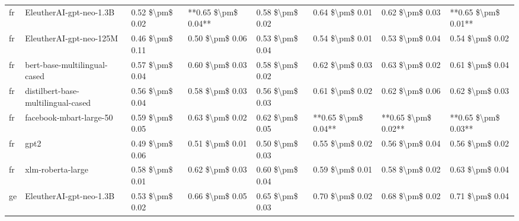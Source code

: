 \begin{tabular}{llllllll}
      fr &            EleutherAI-gpt-neo-1.3B & 0.52 \$\textbackslash pm\$ 0.02 &       **0.65 \$\textbackslash pm\$ 0.04** &       0.58 \$\textbackslash pm\$ 0.02 &        0.64 \$\textbackslash pm\$ 0.01 &                         0.62 \$\textbackslash pm\$ 0.03 & **0.65 \$\textbackslash pm\$ 0.01** \\
      fr &            EleutherAI-gpt-neo-125M & 0.46 \$\textbackslash pm\$ 0.11 &           0.50 \$\textbackslash pm\$ 0.06 &       0.53 \$\textbackslash pm\$ 0.04 &        0.54 \$\textbackslash pm\$ 0.01 &                         0.53 \$\textbackslash pm\$ 0.04 &     0.54 \$\textbackslash pm\$ 0.02 \\
      fr &       bert-base-multilingual-cased & 0.57 \$\textbackslash pm\$ 0.04 &           0.60 \$\textbackslash pm\$ 0.03 &       0.58 \$\textbackslash pm\$ 0.02 &        0.62 \$\textbackslash pm\$ 0.03 &                         0.63 \$\textbackslash pm\$ 0.02 &     0.61 \$\textbackslash pm\$ 0.04 \\
      fr & distilbert-base-multilingual-cased & 0.56 \$\textbackslash pm\$ 0.04 &           0.58 \$\textbackslash pm\$ 0.03 &       0.56 \$\textbackslash pm\$ 0.03 &        0.61 \$\textbackslash pm\$ 0.02 &                         0.62 \$\textbackslash pm\$ 0.06 &     0.62 \$\textbackslash pm\$ 0.03 \\
      fr &            facebook-mbart-large-50 & 0.59 \$\textbackslash pm\$ 0.05 &           0.63 \$\textbackslash pm\$ 0.02 &       0.62 \$\textbackslash pm\$ 0.05 &    **0.65 \$\textbackslash pm\$ 0.04** &                     **0.65 \$\textbackslash pm\$ 0.02** & **0.65 \$\textbackslash pm\$ 0.03** \\
      fr &                               gpt2 & 0.49 \$\textbackslash pm\$ 0.06 &           0.51 \$\textbackslash pm\$ 0.01 &       0.50 \$\textbackslash pm\$ 0.03 &        0.55 \$\textbackslash pm\$ 0.02 &                         0.56 \$\textbackslash pm\$ 0.04 &     0.56 \$\textbackslash pm\$ 0.02 \\
      fr &                  xlm-roberta-large & 0.58 \$\textbackslash pm\$ 0.01 &           0.62 \$\textbackslash pm\$ 0.03 &       0.60 \$\textbackslash pm\$ 0.04 &        0.59 \$\textbackslash pm\$ 0.01 &                         0.58 \$\textbackslash pm\$ 0.02 &     0.63 \$\textbackslash pm\$ 0.04 \\
      ge &            EleutherAI-gpt-neo-1.3B & 0.53 \$\textbackslash pm\$ 0.02 &           0.66 \$\textbackslash pm\$ 0.05 &       0.65 \$\textbackslash pm\$ 0.03 &        0.70 \$\textbackslash pm\$ 0.02 &                         0.68 \$\textbackslash pm\$ 0.02 &     0.71 \$\textbackslash pm\$ 0.04 \\

\end{tabular}
